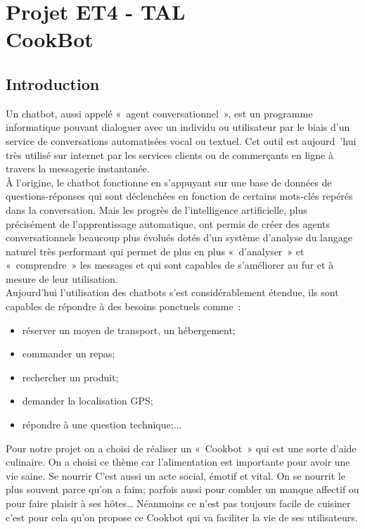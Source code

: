 \documentclass{report}
\title{}\let\mytitle\thetitle
\author{Karim \textsc{Balde}\\Yasmine \textsc{Kertous}\\Thibault \textsc{Lasou}}
\date\today
\begin{document}
\pagestyle{polytech}
\chapter*{Projet ET4 - TAL\\CookBot}
\section*{Introduction}

Un chatbot, aussi appelé « agent conversationnel », est un programme informatique pouvant dialoguer avec un individu ou utilisateur par le biais d'un service de conversations automatisées vocal ou textuel. Cet outil est aujourd 'hui très utilisé sur internet par les services clients ou de commerçants en ligne à travers la messagerie instantanée.\\

À l'origine, le chatbot fonctionne en s'appuyant sur une base de données de questions-réponses qui sont déclenchées en fonction de certains mots-clés repérés dans la conversation. Mais les progrès de l'intelligence artificielle, plus précisément de l'apprentissage automatique, ont permis de créer des agents conversationnels beaucoup plus évolués dotés d'un système d'analyse du langage naturel très performant qui  permet de plus en plus « d'analyser » et « comprendre » les messages et qui sont capables de s'améliorer au fur et à mesure de leur utilisation.\\


Aujourd'hui l'utilisation des chatbots s'est considérablement étendue, ils sont capables de répondre à des besoins ponctuels comme :
\begin{itemize}
\item réserver un moyen de transport, un hébergement;
\item commander un repas;
\item rechercher un produit;
\item demander la localisation GPS;
\item répondre à une question technique;...
\end{itemize}
Pour notre projet on a choisi de réaliser un « Cookbot » qui est une sorte d'aide culinaire. On a choisi ce thème car l’alimentation est importante pour avoir une vie saine. Se nourrir C'est aussi un acte social, émotif et vital. On se nourrit le plus souvent parce qu'on a faim; parfois aussi pour combler un manque affectif ou pour faire plaisir à ses hôtes… Néanmoins ce n'est pas toujours facile de cuisiner c'est pour cela qu'on propose ce Cookbot qui va faciliter la vie de ses utilisateurs.\\
\end{document}
